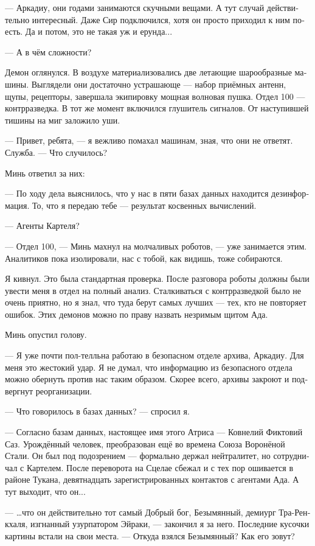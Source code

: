 \documentclass[a4paper,12pt,fleqn]{book}\usepackage{polyglossia}\setdefaultlanguage[babelshorthands=true]{russian}\setotherlanguage{english}\defaultfontfeatures{Ligatures=TeX,Mapping=tex-text}\usepackage{xcolor}\newcommand{\ml}[3]{#2}
\begin{document}
{--- Аркадиу, они годами занимаются скучными вещами.
А тут случай действительно интересный.
Даже Сир подключился, хотя он просто приходил к ним поесть.
Да и потом, это не такая уж и ерунда...

--- А в чём сложности?

Демон оглянулся.
В воздухе материализовались две летающие шарообразные машины.
Выглядели они достаточно устрашающе --- набор приёмных антенн, щупы, рецепторы, завершала экипировку мощная волновая пушка.
Отдел 100 --- контрразведка.
В тот же момент включился глушитель сигналов.
От наступившей тишины на миг заложило уши.

--- Привет, ребята, --- я вежливо помахал машинам, зная, что они не ответят.
Служба.
--- Что случилось?

Минь ответил за них:

--- По ходу дела выяснилось, что у нас в пяти базах данных находится дезинформация.
То, что я передаю тебе --- результат косвенных вычислений.

--- Агенты Картеля?

--- Отдел 100, --- Минь махнул на молчаливых роботов, --- уже занимается этим.
Аналитиков пока изолировали, нас с тобой, как видишь, тоже собираются.

Я кивнул.
Это была стандартная проверка.
После разговора роботы должны были увести меня в отдел на полный анализ.
Сталкиваться с контрразведкой было не очень приятно, но я знал, что туда берут самых лучших --- тех, кто не повторяет ошибок.
Этих демонов можно по праву назвать незримым щитом Ада.

Минь опустил голову.

--- Я уже почти пол-телльна работаю в безопасном отделе архива, Аркадиу.
Для меня это жестокий удар.
Я не думал, что информацию из безопасного отдела можно обернуть против нас таким образом.
Скорее всего, архивы закроют и подвергнут реорганизации.

--- Что говорилось в базах данных? --- спросил я.

--- Согласно базам данных, настоящее имя этого Атриса --- Ковнелий Фиктовий Саз.
Урождённый человек, преобразован ещё во времена Союза Воронёной Стали.
Он был под подозрением --- формально держал нейтралитет, но сотрудничал с Картелем.
После переворота на Сцелае сбежал и с тех пор ошивается в районе Тукана, девятнадцать зарегистрированных контактов с агентами Ада.
А тут выходит, что он...

--- \ldots что он действительно тот самый Добрый бог, Безымянный, демиург Тра-Ренкхаля, изгнанный узурпатором Эйраки, --- закончил я за него.
Последние кусочки картины встали на свои места.
--- Откуда взялся Безымянный?
Как его зовут?

}
\end{document}
